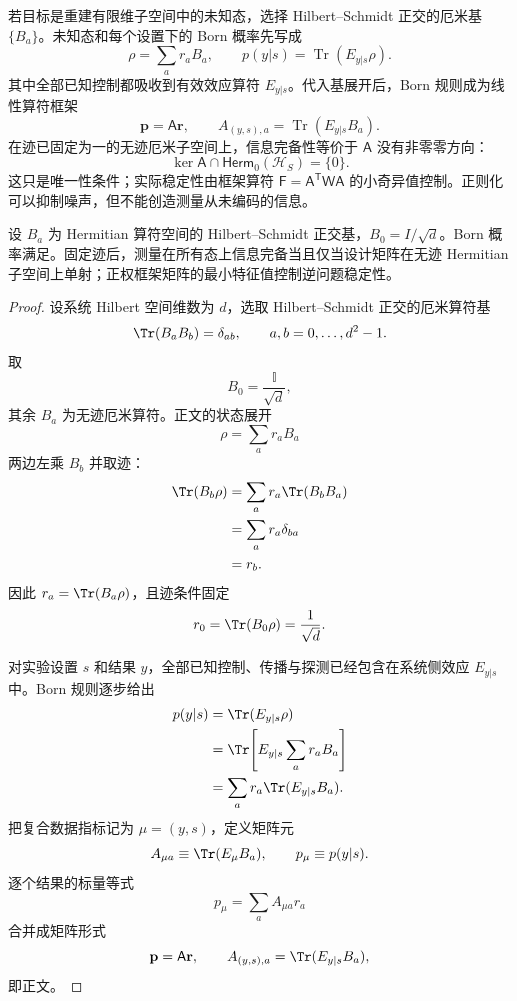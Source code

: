 若目标是重建有限维子空间中的未知态，选择 Hilbert--Schmidt 正交的厄米基 $\{B_a\}$。未知态和每个设置下的 Born 概率先写成
\begin{equation}
\boxed{
\rho=\sum_a r_aB_a,
\qquad
p(y|s)=\operatorname{Tr}(E_{y|s}\rho).}
\label{eq:finite_dimensional_state_operator_expansion}
\end{equation}
其中全部已知控制都吸收到有效效应算符 $E_{y|s}$。代入基展开后，Born 规则成为线性算符框架
\begin{equation}
\boxed{
\mathbf p=\mathsf A\mathbf r,
\qquad
A_{(y,s),a}=\operatorname{Tr}(E_{y|s}B_a).}
\label{eq:measurement_operator_frame}
\end{equation}
在迹已固定为一的无迹厄米子空间上，信息完备性等价于 $\mathsf A$ 没有非零零方向：
\[
\ker\mathsf A\cap\mathsf{Herm}_0(\mathcal H_S)=\{0\}.
\]
这只是唯一性条件；实际稳定性由框架算符 $\mathsf F=\mathsf A^{\mathsf T}\mathsf W\mathsf A$ 的小奇异值控制。正则化可以抑制噪声，但不能创造测量从未编码的信息。

\begin{proposition}[有限维量子态的测量算符框架]
设 $B_a$ 为 Hermitian 算符空间的 Hilbert--Schmidt 正交基，$B_0=I/\sqrt d$。Born 概率满足。固定迹后，测量在所有态上信息完备当且仅当设计矩阵在无迹 Hermitian 子空间上单射；正权框架矩阵的最小特征值控制逆问题稳定性。
\end{proposition}
\begin{proof}
设系统 Hilbert 空间维数为 $d$，选取 Hilbert--Schmidt 正交的厄米算符基
\[
\Tr(B_aB_b)=\delta_{ab},
\qquad a,b=0,\ldots,d^2-1.
\]
取
\[
B_0=\frac{\mathbb I}{\sqrt d},
\]
其余 $B_a$ 为无迹厄米算符。正文的状态展开
\[
\rho=\sum_a r_aB_a
\]
两边左乘 $B_b$ 并取迹：
\begin{align*}
\Tr(B_b\rho)
&=\sum_a r_a\Tr(B_bB_a)\\
&=\sum_a r_a\delta_{ba}\\
&=r_b.
\end{align*}
因此 $r_a=\Tr(B_a\rho)$，且迹条件固定
\[
r_0=\Tr(B_0\rho)=\frac1{\sqrt d}.
\]

对实验设置 $s$ 和结果 $y$，全部已知控制、传播与探测已经包含在系统侧效应 $E_{y|s}$ 中。Born 规则逐步给出
\begin{align*}
p(y|s)
&=\Tr(E_{y|s}\rho)\\
&=\Tr\!\left[E_{y|s}\sum_a r_aB_a\right]\\
&=\sum_a r_a\Tr(E_{y|s}B_a).
\end{align*}
把复合数据指标记为 $\mu=(y,s)$，定义矩阵元
\[
A_{\mu a}\equiv\Tr(E_\mu B_a),
\qquad
p_\mu\equiv p(y|s).
\]
逐个结果的标量等式
\[
p_\mu=\sum_aA_{\mu a}r_a
\]
合并成矩阵形式
\[
\mathbf p=\mathsf A\mathbf r,
\qquad
A_{(y,s),a}=\Tr(E_{y|s}B_a),
\]
即正文。
\end{proof}


